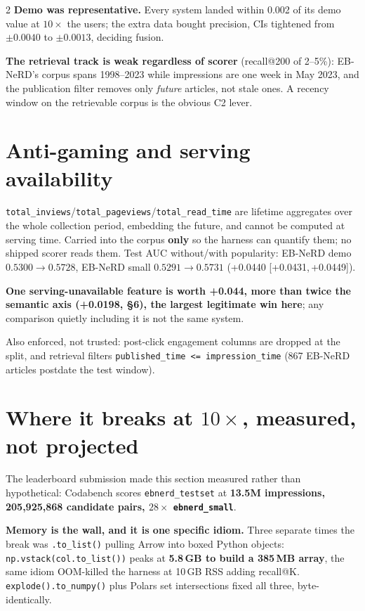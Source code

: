 \documentclass[10pt,a4paper]{article}
\newcommand{\ci}[2]{{\scriptsize[#1,\,#2]}}
\begin{document}
\begin{multicols}{2}
\textbf{Demo was representative.} Every system landed within 0.002 of its demo value at $10\times$ the
users; the extra data bought precision, CIs tightened from $\pm0.0040$ to $\pm0.0013$, deciding fusion.

\textbf{The retrieval track is weak regardless of scorer} (recall@200 of 2--5\%): EB-NeRD's corpus
spans 1998--2023 while impressions are one week in May 2023, and the publication filter removes only
\emph{future} articles, not stale ones. A recency window on the retrievable corpus is the obvious C2
lever.

\section{Anti-gaming and serving availability}

\texttt{total\_inviews}/\texttt{total\_pageviews}/\texttt{total\_read\_time} are lifetime aggregates
over the whole collection period, embedding the future, and cannot be computed at serving time. Carried
into the corpus \textbf{only} so the harness can quantify them; no shipped scorer reads them. Test AUC
without/with popularity: EB-NeRD demo $0.5300 \rightarrow 0.5728$, EB-NeRD small $0.5291 \rightarrow
0.5731$ (+0.0440 \ci{+0.0431}{+0.0449}).

\textbf{One serving-unavailable feature is worth +0.044, more than twice the semantic axis (+0.0198,
\S6), the largest legitimate win here}; any comparison quietly including it is not the same system.

Also enforced, not trusted: post-click engagement columns are dropped at the split, and retrieval
filters \texttt{published\_time <= impression\_time} (867 EB-NeRD articles postdate the test window).

\section{Where it breaks at $10\times$, measured, not projected}

The leaderboard submission made this section measured rather than hypothetical: Codabench scores
\texttt{ebnerd\_testset} at \textbf{13.5M impressions, 205,925,868 candidate pairs, $28\times$
\texttt{ebnerd\_small}}.

\textbf{Memory is the wall, and it is one specific idiom.} Three separate times the break was
\texttt{.to\_list()} pulling Arrow into boxed Python objects: \texttt{np.vstack(col.to\_list())} peaks
at \textbf{5.8\,GB to build a 385\,MB array}, the same idiom OOM-killed the harness at 10\,GB RSS
adding recall@K. \texttt{explode().to\_numpy()} plus Polars set intersections fixed all three,
byte-identically.


\end{multicols}
\end{document}
